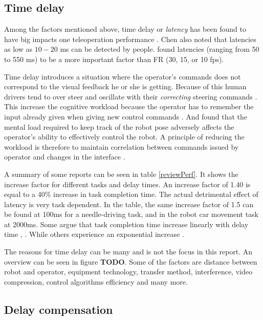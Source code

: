 \subsection{Time delay}
Among the factors mentioned above, time delay or \emph{latency} has been found to have big impacts one teleoperation performance \citep{Chen2007}. Chen also noted that latencies as low as $10-20$ ms can be detected by people. \citep{Arthur1993} found latencies (ranging from 50 to 550 ms) to be a more important factor than FR (30, 15, or 10 fps). 

Time delay introduces a situation where the operator's commands does not correspond to the visual feedback he or she is getting. Because of this human drivers tend to over steer and oscillate with their \emph{correcting} steering commands \citep{Appelqvist2007}. This increase the cognitive workload because the operator has to remember the input already given when giving new control commands \citep{Matheson2013}. And \citep{Ricks2004} found that the mental load required to keep track of the robot pose adversely affects the operator's ability to effectively control the robot. A principle of reducing the workload is therefore to maintain correlation between commands issued by operator and changes in the interface \citep{Nielsen2007}. 

A summary of some reports can be seen in table \ref{reviewPerf}. It shows the increase factor for different tasks and delay times. An increase factor of 1.40 is equal to a 40\% increase in task completion time. The actual detrimental effect of latency is very task dependent. In the table, the same increase factor of 1.5 can be found at 100ms for a needle-driving task, and in the robot car movement task at 2000ms.
Some argue that task completion time increase linearly with delay time \citep{Ando1999}, \citep{Lane2002}. While others experience an exponential increase \citep{Xu2014}.



The reasons for time delay can be many and is not the focus in this report. An overview can be seen in figure \textbf{TODO}. Some of the factors are distance between robot and operator, equipment technology, transfer method, interference, video compression, control algorithms efficiency and many more.



\subsection{Delay compensation}

